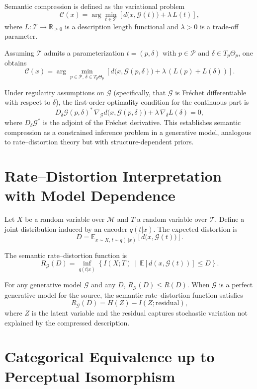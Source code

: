 \documentclass[11pt,a4paper]{article}
\theoremstyle{definition}
\theoremstyle{remark}
\begin{document}
Semantic compression is defined as the variational problem
\[
\mathcal{C}(x) = \arg\min_{t \in \mathcal{T}} \left[ d\big(x, \mathcal{G}(t)\big) + \lambda \, L(t) \right],
\]
where $L : \mathcal{T} \to \mathbb{R}_{\ge 0}$ is a description length functional and $\lambda > 0$ is a trade-off parameter.

Assuming $\mathcal{T}$ admits a parameterization $t = (p, \delta)$ with $p \in \mathcal{P}$ and $\delta \in T_p\Theta_p$, one obtains
\[
\mathcal{C}(x) = \arg\min_{p \in \mathcal{P}, \, \delta \in T_p\Theta_p} \left[ d\big(x, \mathcal{G}(p,\delta)\big) + \lambda \, (L(p) + L(\delta)) \right].
\]

Under regularity assumptions on $\mathcal{G}$ (specifically, that $\mathcal{G}$ is Fr\'{e}chet differentiable with respect to $\delta$), the first-order optimality condition for the continuous part is
\[
D_\delta \mathcal{G}(p, \delta)^* \, \nabla_{\mathcal{G}} d\big(x, \mathcal{G}(p,\delta)\big) + \lambda \, \nabla_\delta L(\delta) = 0,
\]
where $D_\delta \mathcal{G}^*$ is the adjoint of the Fr\'{e}chet derivative. This establishes semantic compression as a constrained inference problem in a generative model, analogous to rate--distortion theory but with structure-dependent priors.

\section{Rate--Distortion Interpretation with Model Dependence}
\label{app:ratedistortion}

Let $X$ be a random variable over $\mathcal{M}$ and $T$ a random variable over $\mathcal{T}$. Define a joint distribution induced by an encoder $q(t|x)$. The expected distortion is
\[
D = \mathbb{E}_{x \sim X, \, t \sim q(\cdot|x)} \left[ d\big(x, \mathcal{G}(t)\big) \right].
\]

The semantic rate--distortion function is
\[
R_{\mathcal{G}}(D) = \inf_{q(t|x)} \left\{ I(X;T) \,\middle|\, \mathbb{E}[d(x,\mathcal{G}(t))] \le D \right\}.
\]

For any generative model $\mathcal{G}$ and any $D$, $R_{\mathcal{G}}(D) \le R(D)$. When $\mathcal{G}$ is a perfect generative model for the source, the semantic rate--distortion function satisfies
\[
R_{\mathcal{G}}(D) = H(Z) - I(Z; \text{residual}),
\]
where $Z$ is the latent variable and the residual captures stochastic variation not explained by the compressed description.

\section{Categorical Equivalence up to Perceptual Isomorphism}
\label{app:equivalence}
\end{document}
